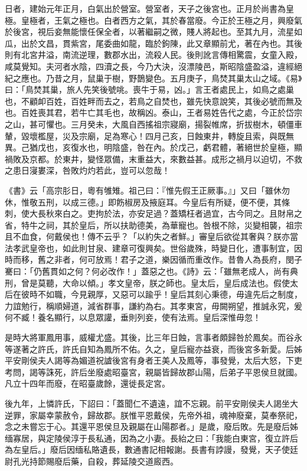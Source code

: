 \begin{pinyinscope}
日者，建始元年正月，白氣出於營室。營室者，天子之後宮也。正月於尚書為皇極。皇極者，王氣之極也。白者西方之氣，其於春當廢。今正於王極之月，興廢氣於後宮，視后妾無能懷任保全者，以著繼嗣之微，賤人將起也。至其九月，流星如瓜，出於文昌，貫紫宮，尾委曲如龍，臨於鉤陳，此又章顯前尤，著在內也。其後則有北宮井溢，南流逆理，數郡水出，流殺人民。後則訛言傳相驚震，女童入殿，咸莫覺知。夫河者水陰，四瀆之長，今乃大決，沒漂陵邑，斯昭陰盛盈溢，違經絕紀之應也。乃昔之月，鼠巢于樹，野鵲變色。五月庚子，鳥焚其巢太山之域。《易》曰：「鳥焚其巢，旅人先笑後號咷。喪牛于易，凶。」言王者處民上，如鳥之處巢也，不顧卹百姓，百姓畔而去之，若鳥之自焚也，雖先快意說笑，其後必號而無及也。百姓喪其君，若牛亡其毛也，故稱凶。泰山，王者易姓告代之處，今正於岱宗之山，甚可懼也。三月癸未，大風自西搖祖宗寢廟，揚裂帷席，折拔樹木，頓僵車輦，毀壞檻屋，災及宗廟，足為寒心！四月己亥，日蝕東井，轉旋且索，與既無異。己猶戊也，亥復水也，明陰盛，咎在內。於戊己，虧君體，著絕世於皇極，顯禍敗及京都。於東井，變怪眾備，末重益大，來數益甚。成形之禍月以迫切，不救之患日寖婁深，咎敗灼灼若此，豈可以忽哉！

《書》云「高宗肜日，粵有雊雉。祖己曰：『惟先假王正厥事。』」又曰「雖休勿休，惟敬五刑，以成三德。」即飭椒房及掖庭耳。今皇后有所疑，便不便，其條刺，使大長秋來白之。吏拘於法，亦安足過？蓋矯枉者過宜，古今同之。且財帛之省，特牛之祠，其於皇后，所以扶助德美，為華寵也。咎根不除，災變相襲，祖宗且不血食，何戴侯也！傳不云乎？「以約失之者鮮。」審皇后欲從其奢與？朕亦當法孝武皇帝也，如此則甘泉、建章可復興矣。世俗歲殊，時變日化，遭事制宜，因時而移，舊之非者，何可放焉！君子之道，樂因循而重改作。昔魯人為長府，閔子騫曰：「仍舊貫如之何？何必改作！」蓋惡之也。《詩》云：「雖無老成人，尚有典刑，曾是莫聽，大命以傾。」孝文皇帝，朕之師也。皇太后，皇后成法也。假使太后在彼時不如職，今見親厚，又惡可以踰乎！皇后其刻心秉德，毋違先后之制度，力誼勉行，稱順婦道，減省群事，謙約為右。其孝東宮，毋闕朔望，推誠永究，爰何不臧！養名顯行，以息眾讙，垂則列妾，使有法焉。皇后深惟毋忽！

是時大將軍鳳用事，威權尤盛。其後，比三年日蝕，言事者頗歸咎於鳳矣。而谷永等遂著之許氏，許氏自知為鳳所不佑。久之，皇后寵亦益衰，而後宮多新愛。后姊平安剛侯夫人謁等為媚道祝謯後宮有身者王美人及鳳等，事發覺，太后大怒，下吏考問，謁等誅死，許后坐廢處昭臺宮，親屬皆歸故郡山陽，后弟子平恩侯旦就國。凡立十四年而廢，在昭臺歲餘，還徙長定宮。

後九年，上憐許氏，下詔曰：「蓋聞仁不遺遠，誼不忘親。前平安剛侯夫人謁坐大逆罪，家屬幸蒙赦令，歸故郡。朕惟平恩戴侯，先帝外祖，魂神廢棄，莫奉祭祀，念之未嘗忘于心。其還平恩侯旦及親屬在山陽郡者。」是歲，廢后敗。先是廢后姊缅寡居，與定陵侯淳于長私通，因為之小妻。長紿之曰：「我能白東宮，復立許后為左皇后。」廢后因缅私賂遺長，數通書記相報謝。長書有誖謾，發覺，天子使廷尉孔光持節賜廢后藥，自殺，葬延陵交道廄西。


\end{pinyinscope}
